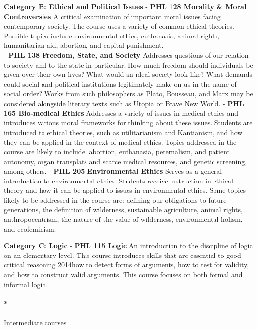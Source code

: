 \documentclass[
  letterpaper,
]{scrbook}
\let\oldparagraph\paragraph
\renewcommand{\paragraph}[1]{\oldparagraph{#1}\mbox{}}
\begin{document}
\textbf{Category B: Ethical and Political Issues} - \textbf{PHL 128
Morality \& Moral Controversies} A critical examination of important
moral issues facing contemporary society. The course uses a variety of
common ethical theories. Possible topics include environmental ethics,
euthanasia, animal rights, humanitarian aid, abortion, and capital
punishment.\\
- \textbf{PHL 138 Freedom, State, and Society} Addresses questions of
our relation to society and to the state in particular. How much freedom
should individuals be given over their own lives? What would an ideal
society look like? What demands could social and political institutions
legitimately make on us in the name of social order? Works from such
philosophers as Plato, Rousseau, and Marx may be considered alongside
literary texts such as Utopia or Brave New World. - \textbf{PHL 165
Bio-medical Ethics} Addresses a variety of issues in medical ethics and
introduces various moral frameworks for thinking about these issues.
Students are introduced to ethical theories, such as utilitarianism and
Kantianism, and how they can be applied in the context of medical
ethics. Topics addressed in the course are likely to include: abortion,
euthanasia, peternalism, and patient autonomy, organ transplats and
scarce medical resources, and genetic screening, among others. -
\textbf{PHL 205 Environmental Ethics} Serves as a general introduction
to environmental ethics. Students receive instruction in ethical theory
and how it can be applied to issues in environmental ethics. Some topics
likely to be addressed in the course are: defining our obligations to
future generations, the definition of wilderness, sustainable
agriculture, animal rights, anthropocentrism, the nature of the value of
wilderness, environmental holism, and ecofeminism.

\textbf{Category C: Logic} - \textbf{PHL 115 Logic} An introduction to
the discipline of logic on an elementary level. This course introduces
skills that are essential to good critical reasoning 2014how to detect
forms of arguments, how to test for validity, and how to construct valid
arguments. This course focuses on both formal and informal logic.

\hypertarget{intermediate-courses}{%
\paragraph*{Intermediate courses}\label{intermediate-courses}}
\end{document}
